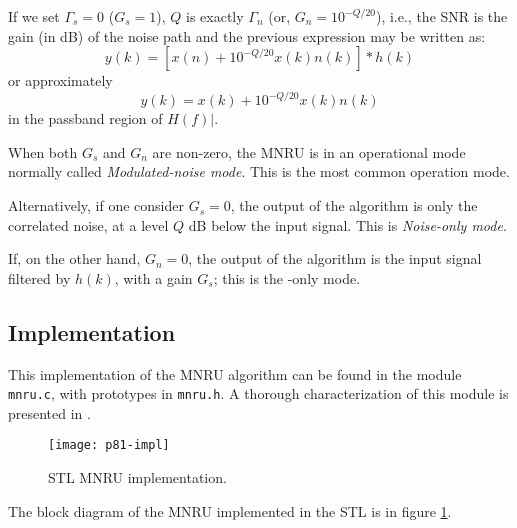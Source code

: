 If we set $\Gamma_s=0$ ($G_s=1$), $Q$ is exactly $\Gamma_n$ (or, $G_n=10^{-Q/20}$), i.e., the SNR is the gain (in dB) of the noise
path and the previous expression may be written as:
\[
y(k)=[x(n)+10^{-Q/20} x(k) n(k)] \ast h(k)
\]
or approximately
\[
y(k)=x(k)+10^{-Q/20} x(k) n(k)
\]
in the passband region of $H(f)|$.

When both $G_s$ and $G_n$ are non-zero, the MNRU is in an operational mode normally called {\em Modulated-noise mode}.
This is the most common operation mode.

Alternatively, if one consider $G_s=0$, the output of the algorithm is only the correlated noise, at a level $Q$ dB below the input signal.
This is {\em Noise-only mode}.

If, on the other hand, $G_n=0$, the output of the algorithm is the input signal filtered by $h(k)$, with a gain $G_s$;
this is the {\emSignal-only mode}.

\subsection{Implementation}

This implementation of the MNRU algorithm can be found in the module {\tt mnru.c}, with prototypes in {\tt mnru.h}.
A thorough characterization of this module is presented in \cite{Duo-MNRU}.

\begin{figure}[ht]
  \begin{center}
    \texttt{[image: p81-impl]}
  \end{center}
   \caption{STL MNRU implementation.\label{STL96-MNRU}}
\end{figure}

The block diagram of the MNRU implemented in the STL is in figure \ref{STL96-MNRU}.

